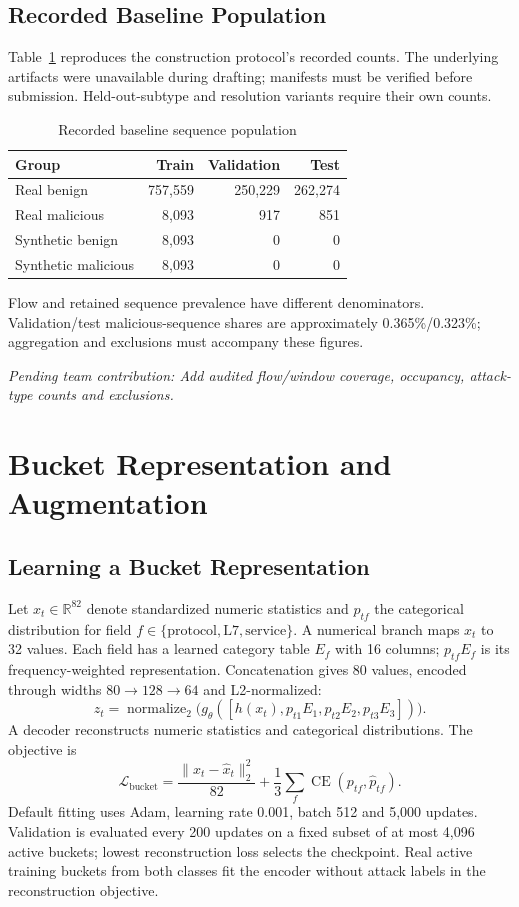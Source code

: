 \documentclass[conference]{IEEEtran}
\newcommand{\pending}[1]{\par\noindent\textit{Pending team contribution: #1}\par}
\begin{document}
\subsection{Recorded Baseline Population}
Table~\ref{tab:population} reproduces the construction protocol's recorded counts. The underlying artifacts were unavailable during drafting; manifests must be verified before submission. Held-out-subtype and resolution variants require their own counts.
\begin{table}[t]
\caption{Recorded baseline sequence population}
\label{tab:population}
\centering\small
\begin{tabular}{lrrr}
\toprule
Group & Train & Validation & Test\\
\midrule
Real benign & 757,559 & 250,229 & 262,274\\
Real malicious & 8,093 & 917 & 851\\
Synthetic benign & 8,093 & 0 & 0\\
Synthetic malicious & 8,093 & 0 & 0\\
\bottomrule
\end{tabular}
\end{table}
Flow and retained sequence prevalence have different denominators. Validation/test malicious-sequence shares are approximately 0.365\%/0.323\%; aggregation and exclusions must accompany these figures.
\pending{Add audited flow/window coverage, occupancy, attack-type counts and exclusions.}

\section{Bucket Representation and Augmentation}
\subsection{Learning a Bucket Representation}
Let $x_t\in\mathbb{R}^{82}$ denote standardized numeric statistics and $p_{tf}$ the categorical distribution for field $f\in\{\mathrm{protocol,L7,service}\}$. A numerical branch maps $x_t$ to 32 values. Each field has a learned category table $E_f$ with 16 columns; $p_{tf}E_f$ is its frequency-weighted representation. Concatenation gives 80 values, encoded through widths $80\rightarrow128\rightarrow64$ and L2-normalized:
\begin{equation}
z_t=\operatorname{normalize}_2\bigl(g_\theta([h(x_t),p_{t1}E_1,p_{t2}E_2,p_{t3}E_3])\bigr).
\end{equation}
A decoder reconstructs numeric statistics and categorical distributions. The objective is
\begin{equation}
\mathcal{L}_{\mathrm{bucket}}=\frac{\|x_t-\hat{x}_t\|_2^2}{82}+\frac{1}{3}\sum_f\operatorname{CE}(p_{tf},\hat{p}_{tf}).
\end{equation}
Default fitting uses Adam, learning rate 0.001, batch 512 and 5,000 updates. Validation is evaluated every 200 updates on a fixed subset of at most 4,096 active buckets; lowest reconstruction loss selects the checkpoint. Real active training buckets from both classes fit the encoder without attack labels in the reconstruction objective.
\end{document}
